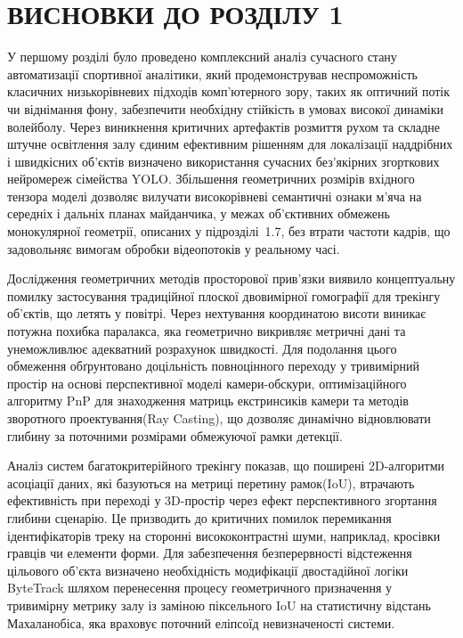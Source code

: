 \begin{unnumbered}

\section*{ВИСНОВКИ ДО РОЗДІЛУ 1}

У першому розділі було проведено комплексний аналіз сучасного стану автоматизації спортивної аналітики, який
продемонстрував неспроможність класичних низькорівневих підходів комп'ютерного зору, таких як оптичний потік чи
віднімання фону, забезпечити необхідну стійкість в умовах високої динаміки волейболу. Через виникнення критичних
артефактів розмиття рухом та складне штучне освітлення залу єдиним ефективним рішенням для локалізації
наддрібних і швидкісних об'єктів визначено використання сучасних без'якірних згорткових нейромереж сімейства \gls{YOLO}.
Збільшення геометричних розмірів вхідного тензора моделі дозволяє вилучати високорівневі семантичні ознаки
м'яча на середніх і дальніх планах майданчика, у межах об'єктивних обмежень монокулярної геометрії, описаних у
підрозділі~1.7, без втрати частоти кадрів, що задовольняє вимогам обробки відеопотоків у реальному часі.

Дослідження геометричних методів просторової прив'язки виявило концептуальну помилку застосування традиційної плоскої
двовимірної гомографії для трекінгу об'єктів, що летять у повітрі. Через нехтування координатою висоти виникає потужна
похибка паралакса, яка геометрично викривляє метричні дані та унеможливлює адекватний розрахунок швидкості. Для
подолання цього обмеження обґрунтовано доцільність повноцінного переходу у тривимірний простір на основі перспективної
моделі камери-обскури, оптимізаційного алгоритму \gls{PnP} для знаходження матриць екстринсиків камери та
методів зворотного проектування(Ray Casting), що дозволяє динамічно відновлювати глибину за поточними розмірами
обмежуючої рамки детекції.

Аналіз систем багатокритерійного трекінгу показав, що поширені 2D-алгоритми асоціації даних, які базуються на метриці
перетину рамок(\gls{IoU}), втрачають ефективність при переході у 3D-простір через ефект перспективного згортання глибини
сценарію. Це призводить до критичних помилок перемикання ідентифікаторів треку на сторонні висококонтрастні шуми,
наприклад, кросівки гравців чи елементи форми. Для забезпечення безперервності відстеження цільового об'єкта визначено
необхідність модифікації двостадійної логіки ByteTrack шляхом перенесення процесу геометричного призначення у
тривимірну метрику залу із заміною піксельного \gls{IoU} на статистичну відстань Махаланобіса, яка враховує поточний
еліпсоїд невизначеності системи.


\end{unnumbered}
